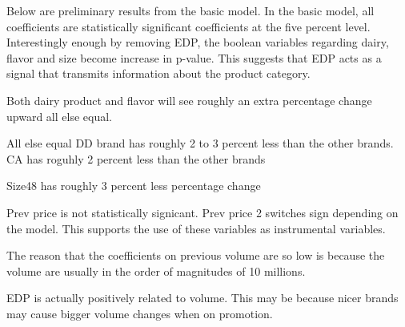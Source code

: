\documentclass{article}
\begin{document}
Below are preliminary results from the basic model. In the basic model, all coefficients are statistically significant coefficients at the five percent level. Interestingly enough by removing EDP, the boolean variables regarding dairy, flavor and size become increase in p-value. This suggests that EDP acts as a signal that transmits information about the product category.

Both dairy product and flavor will see roughly an extra percentage change upward all else equal.

All else equal DD brand has roughly 2 to 3 percent less than the other brands. CA has roguhly 2 percent less than the other brands

Size48 has roughly 3 percent less percentage change

Prev price is not statistically signicant. Prev price 2 switches sign depending on the model. This supports the use of these variables as instrumental variables.

The reason that the coefficients on previous volume are so low is because the volume are usually in the order of magnitudes of 10 millions.


EDP is actually positively related to volume. This may be because nicer brands may cause bigger volume changes when on promotion.
\end{document}
